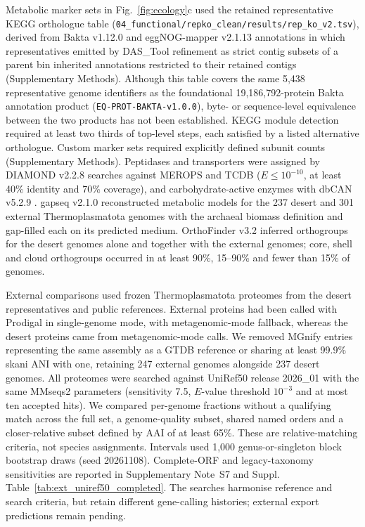 \documentclass[11pt]{article}
\begin{document}
Metabolic marker sets in Fig.~\ref{fig:ecology}c used the retained representative KEGG orthologue table (\texttt{04\_functional/repko\_clean/results/rep\_ko\_v2.tsv}), derived from Bakta v1.12.0 \citep{schwengers2021bakta} and eggNOG-mapper v2.1.13 \citep{cantalapiedra2021eggnog} annotations in which representatives emitted by DAS\_Tool refinement as strict contig subsets of a parent bin inherited annotations restricted to their retained contigs (Supplementary Methods). Although this table covers the same 5,438 representative genome identifiers as the foundational 19,186,792-protein Bakta annotation product (\texttt{EQ-PROT-BAKTA-v1.0.0}), byte- or sequence-level equivalence between the two products has not been established. KEGG module detection required at least two thirds of top-level steps, each satisfied by a listed alternative orthologue. Custom marker sets required explicitly defined subunit counts (Supplementary Methods). Peptidases and transporters were assigned by DIAMOND v2.2.8 searches against MEROPS \citep{rawlings2018merops} and TCDB \citep{saier2021tcdb} ($E\leq 10^{-10}$, at least 40\% identity and 70\% coverage), and carbohydrate-active enzymes with dbCAN v5.2.9 \citep{zheng2023dbcan}. gapseq v2.1.0 \citep{zimmermann2021gapseq} reconstructed metabolic models for the 237 desert and 301 external Thermoplasmatota genomes with the archaeal biomass definition and gap-filled each on its predicted medium. OrthoFinder v3.2 \citep{emms2019orthofinder} inferred orthogroups for the desert genomes alone and together with the external genomes; core, shell and cloud orthogroups occurred in at least 90\%, 15--90\% and fewer than 15\% of genomes.

External comparisons used frozen Thermoplasmatota proteomes from the desert representatives and public references. External proteins had been called with Prodigal in single-genome mode, with metagenomic-mode fallback, whereas the desert proteins came from metagenomic-mode calls. We removed MGnify entries representing the same assembly as a GTDB reference or sharing at least 99.9\% skani ANI with one, retaining 247 external genomes alongside 237 desert genomes. All proteomes were searched against UniRef50 release 2026\_01 with the same MMseqs2 parameters (sensitivity 7.5, $E$-value threshold $10^{-3}$ and at most ten accepted hits). We compared per-genome fractions without a qualifying match across the full set, a genome-quality subset, shared named orders and a closer-relative subset defined by AAI of at least 65\%. These are relative-matching criteria, not species assignments. Intervals used 1,000 genus-or-singleton block bootstrap draws (seed 20261108). Complete-ORF and legacy-taxonomy sensitivities are reported in Supplementary Note~S7 and Suppl. Table~\ref{tab:ext_uniref50_completed}. The searches harmonise reference and search criteria, but retain different gene-calling histories; external export predictions remain pending.
\end{document}
